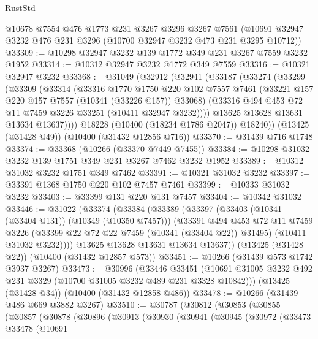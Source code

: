 \begin{lexlean}{RustStd}
\begin{coremodule}
    @10678
    @7554
    @476
    @1773
    @231
    @3267
    @3296
    @3267
    @7561
    (@10691 @32947 @3232 @476 @231 @3296 (@10700 @32947 @3232 @473 @231 @3295 @10712))
@33309 := @10298 @32947 @3232 @139 @1772 @349 @231 @3267 @7559 @3232 @1952
@33314 := @10312 @32947 @3232 @1772 @349 @7559
@33316 := @10321 @32947 @3232
@33368 := @31049
    (@32912
      (@32941
        (@33187
          (@33274
            (@33299
              (@33309
                (@33314
                  (@33316
                    @1770
                    @1750
                    @220
                    @102
                    @7557
                    @7461
                    (@33221 @157 @220 @157 @7557 (@10341 (@33226 @157)) @33068)
                    (@33316 @494 @453 @72 @11 @7459 @3226 @33251 (@10411 @32947 @3232))))
                @13625
                @13628
                @13631
                @13634
                @13637))))
        @18228
        (@10400 (@18234 @1786 @2047))
        @18240))
    (@13425 (@31428 @49))
    (@10400 (@31432 @12856 @716))
@33370 := @31439 @716 @1748
@33374 := @33368 (@10266 (@33370 @7449 @7455))
@33384 := @10298 @31032 @3232 @139 @1751 @349 @231 @3267 @7462 @3232 @1952
@33389 := @10312 @31032 @3232 @1751 @349 @7462
@33391 := @10321 @31032 @3232
@33397 := @33391 @1368 @1750 @220 @102 @7457 @7461
@33399 := @10333 @31032 @3232
@33403 := @33399 @131 @220 @131 @7457
@33404 := @10342 @31032
@33446 := @31022
    (@33374
      (@33384
        (@33389
          (@33397
            (@33403 (@10341 (@33404 @131)) (@10349 (@10350 @7457)))
            (@33391
              @494
              @453
              @72
              @11
              @7459
              @3226
              (@33399 @22 @72 @22 @7459 (@10341 (@33404 @22)) @31495)
              (@10411 @31032 @3232))))
        @13625
        @13628
        @13631
        @13634
        @13637))
    (@13425 (@31428 @22))
    (@10400 (@31432 @12857 @573))
@33451 := @10266 (@31439 @573 @1742 @3937 @3267)
@33473 := @30996
    (@33446
      @33451
      (@10691 @31005 @3232 @492 @231 @3329 (@10700 @31005 @3232 @489 @231 @3328 @10842)))
    (@13425 (@31428 @34))
    (@10400 (@31432 @12858 @486))
@33478 := @10266 (@31439 @486 @669 @3882 @3267)
@33510 := @30787
    (@30812
      (@30853
        (@30855
          (@30857
            (@30878
              (@30896
                (@30913
                  (@30930
                    (@30941
                      (@30945
                        (@30972
                          (@33473
                            @33478
                            (@10691

\end{coremodule}
\end{lexlean}
